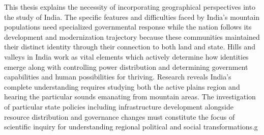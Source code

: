 \vspace{0.3cm}

This thesis explains the necessity of incorporating geographical perspectives into the study of India. The specific features and difficulties faced by India's mountain populations need specialized governmental response while the nation follows its development and modernization trajectory because these communities maintained their distinct identity through their  connection to both land and state. Hills and valleys in India work as vital elements which actively determine how identities emerge along with controlling power distribution and determining government capabilities and human possibilities for thriving. Research reveals India's complete understanding requires studying both the active plains region and hearing the particular sounds emanating from mountain areas.  The investigation of particular state policies including infrastructure development alongside resource distribution and governance changes must constitute the focus of scientific inquiry for understanding regional political and social transformations.g